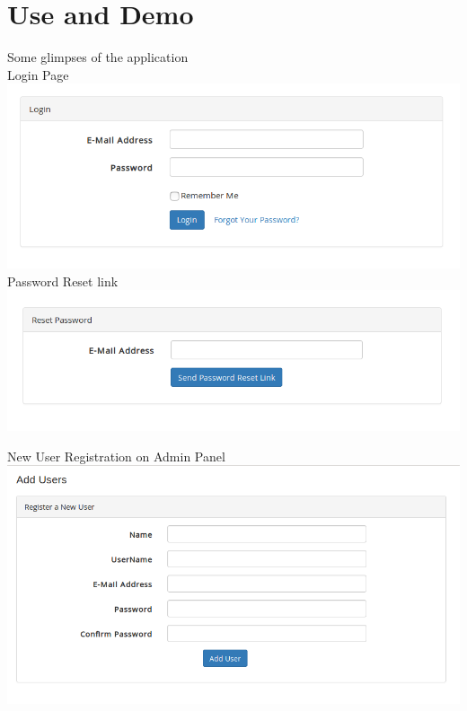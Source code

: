 \documentclass[a4paper,12pt,oneside]{book}
\begin{document}
\section{Use and Demo}
Some glimpses of the application\\
Login Page \\
\includegraphics[scale=0.5]{login.png} \\


\vspace{2in}
Password Reset link \\
\includegraphics[scale=0.4]{password.png}	\\

\vspace{0.7in}

New User Registration on Admin Panel \\
\includegraphics[scale=0.45]{user.png}	\\
\end{document}
